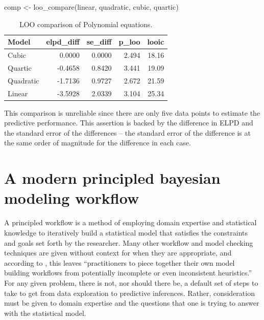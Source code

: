 \documentclass[11pt, oneside, openany]{scrbook}
\newenvironment{Shaded}{\begin{snugshade}}{\end{snugshade}}
\newcommand{\FunctionTok}[1]{\textcolor[rgb]{0.00,0.00,0.00}{#1}}
\newcommand{\NormalTok}[1]{#1}
\newcommand{\OtherTok}[1]{\textcolor[rgb]{0.56,0.35,0.01}{#1}}
\begin{document}
\begin{Shaded}
\begin{Highlighting}[]
\NormalTok{comp }\OtherTok{\textless{}{-}} \FunctionTok{loo\_compare}\NormalTok{(linear, quadratic, cubic, quartic)}
\end{Highlighting}
\end{Shaded}

\begin{table}[!h]

\caption{\label{tab:ch030-Galaxy-Itchy}LOO comparison of Polynomial equations.}
\centering
\begin{tabular}[t]{lrrrr}
\toprule
Model & elpd\_diff & se\_diff & p\_loo & looic\\
\midrule
Cubic & 0.0000 & 0.0000 & 2.494 & 18.16\\
Quartic & -0.4658 & 0.8420 & 3.441 & 19.09\\
Quadratic & -1.7136 & 0.9727 & 2.672 & 21.59\\
Linear & -3.5928 & 2.0339 & 3.104 & 25.34\\
\bottomrule
\end{tabular}
\end{table}

This comparison is unreliable since there are only five data points to estimate the predictive performance. This assertion is backed by the difference in ELPD and the standard error of the differences -- the standard error of the difference is at the same order of magnitude for the difference in each case.

\hypertarget{a-modern-principled-bayesian-modeling-workflow}{%
\section{A modern principled bayesian modeling workflow}\label{a-modern-principled-bayesian-modeling-workflow}}

A principled workflow is a method of employing domain expertise and statistical knowledge to iteratively build a statistical model that satisfies the constraints and goals set forth by the researcher. Many other workflow and model checking techniques are given without context for when they are appropriate, and according to \citet{betancourt2020}, this leaves ``practitioners to piece together their own model building workflows from potentially incomplete or even inconsistent heuristics.'' For any given problem, there is not, nor should there be, a default set of steps to take to get from data exploration to predictive inferences. Rather, consideration must be given to domain expertise and the questions that one is trying to answer with the statistical model.
\end{document}
